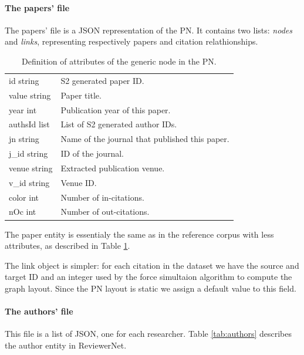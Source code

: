 \paragraph*{The papers' file}
The papers' file is a JSON representation of the PN. It contains two lists: \textit{nodes} and \textit{links}, representing respectively papers and citation relathionships. 
\begin{table}[!ht]
    \centering
    \begin{tabular}{ll}
    id {\color[HTML]{656565}string}    & S2 generated paper ID.           \\ 
    value {\color[HTML]{656565}string} & Paper title.                      \\
    year {\color[HTML]{656565}int}     & Publication year of this paper.   \\
    authsId {\color[HTML]{656565}list} & List of S2 generated author IDs.  \\                
    jn {\color[HTML]{656565}string}                                          & Name of the journal that published this paper. \\
    j\_id {\color[HTML]{656565}string}                                        & ID of the journal.                             \\
    venue {\color[HTML]{656565}string}                                       & Extracted publication venue.                   \\
    v\_id {\color[HTML]{656565}string}                                        & Venue ID.                                      \\
    color {\color[HTML]{656565}int}    & Number of in-citations.            \\  
    nOc {\color[HTML]{656565}int} & Number of out-citations. 
\end{tabular}
    \caption{Definition of attributes of the generic node in the PN. \label{tab:nodes}}
   
    \end{table}

    The paper entity is essentialy the same as in the reference corpus with less attributes, as described in Table \ref{tab:nodes}.
    
    The link object is simpler: for each citation in the dataset we have the source and target ID and an integer used by the force simultaion algorithm to compute the graph layout. Since the PN layout is static we assign a default value to this field. 
\paragraph*{The authors' file}
This file is a list of JSON, one for each researcher. Table \ref{tab:authors} describes the author entity in ReviewerNet.


